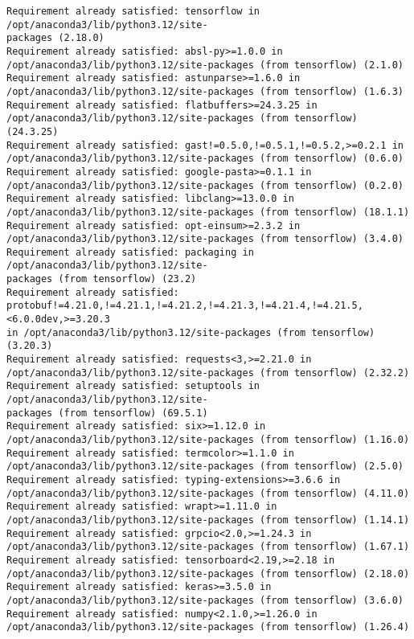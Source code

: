 \documentclass[11pt]{article}
\begin{document}
    \begin{Verbatim}[commandchars=\\\{\}]
Requirement already satisfied: tensorflow in /opt/anaconda3/lib/python3.12/site-
packages (2.18.0)
Requirement already satisfied: absl-py>=1.0.0 in
/opt/anaconda3/lib/python3.12/site-packages (from tensorflow) (2.1.0)
Requirement already satisfied: astunparse>=1.6.0 in
/opt/anaconda3/lib/python3.12/site-packages (from tensorflow) (1.6.3)
Requirement already satisfied: flatbuffers>=24.3.25 in
/opt/anaconda3/lib/python3.12/site-packages (from tensorflow) (24.3.25)
Requirement already satisfied: gast!=0.5.0,!=0.5.1,!=0.5.2,>=0.2.1 in
/opt/anaconda3/lib/python3.12/site-packages (from tensorflow) (0.6.0)
Requirement already satisfied: google-pasta>=0.1.1 in
/opt/anaconda3/lib/python3.12/site-packages (from tensorflow) (0.2.0)
Requirement already satisfied: libclang>=13.0.0 in
/opt/anaconda3/lib/python3.12/site-packages (from tensorflow) (18.1.1)
Requirement already satisfied: opt-einsum>=2.3.2 in
/opt/anaconda3/lib/python3.12/site-packages (from tensorflow) (3.4.0)
Requirement already satisfied: packaging in /opt/anaconda3/lib/python3.12/site-
packages (from tensorflow) (23.2)
Requirement already satisfied:
protobuf!=4.21.0,!=4.21.1,!=4.21.2,!=4.21.3,!=4.21.4,!=4.21.5,<6.0.0dev,>=3.20.3
in /opt/anaconda3/lib/python3.12/site-packages (from tensorflow) (3.20.3)
Requirement already satisfied: requests<3,>=2.21.0 in
/opt/anaconda3/lib/python3.12/site-packages (from tensorflow) (2.32.2)
Requirement already satisfied: setuptools in /opt/anaconda3/lib/python3.12/site-
packages (from tensorflow) (69.5.1)
Requirement already satisfied: six>=1.12.0 in
/opt/anaconda3/lib/python3.12/site-packages (from tensorflow) (1.16.0)
Requirement already satisfied: termcolor>=1.1.0 in
/opt/anaconda3/lib/python3.12/site-packages (from tensorflow) (2.5.0)
Requirement already satisfied: typing-extensions>=3.6.6 in
/opt/anaconda3/lib/python3.12/site-packages (from tensorflow) (4.11.0)
Requirement already satisfied: wrapt>=1.11.0 in
/opt/anaconda3/lib/python3.12/site-packages (from tensorflow) (1.14.1)
Requirement already satisfied: grpcio<2.0,>=1.24.3 in
/opt/anaconda3/lib/python3.12/site-packages (from tensorflow) (1.67.1)
Requirement already satisfied: tensorboard<2.19,>=2.18 in
/opt/anaconda3/lib/python3.12/site-packages (from tensorflow) (2.18.0)
Requirement already satisfied: keras>=3.5.0 in
/opt/anaconda3/lib/python3.12/site-packages (from tensorflow) (3.6.0)
Requirement already satisfied: numpy<2.1.0,>=1.26.0 in
/opt/anaconda3/lib/python3.12/site-packages (from tensorflow) (1.26.4)

\end{Verbatim}
\end{document}
